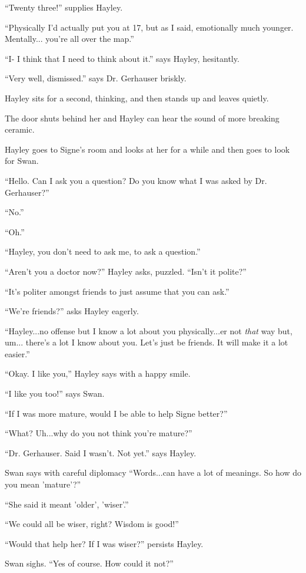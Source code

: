 ``Twenty three!'' supplies Hayley.

``Physically I'd actually put you at 17, but as I said, emotionally much younger.  Mentally... you're all over the map.''

``I- I think that I need to think about it.'' says Hayley, hesitantly.

``Very well, dismissed.'' says Dr. Gerhauser briskly.

Hayley sits for a second, thinking, and then stands up and leaves quietly.

The door shuts behind her and Hayley can hear the sound of more breaking ceramic.



Hayley goes to Signe's room and looks at her for a while and then goes to look for Swan.  

``Hello.  Can I ask you a question?  Do you know what I was asked by Dr. Gerhauser?''

``No.''

``Oh.''

``Hayley, you don't need to ask me, to ask a question.''

``Aren't you a doctor now?'' Hayley asks, puzzled.  ``Isn't it polite?''

``It's politer amongst friends to just assume that you can ask.''

``We're friends?'' asks Hayley eagerly.

``Hayley...no offense but I know a lot about you physically...er not \textit{that }way but, um... there's a lot I know about you. Let's just be friends.  It will make it a lot easier.''

``Okay.  I like you,'' Hayley says with a happy smile.

``I like you too!'' says Swan.

``If I was more mature, would I be able to help Signe better?''

``What?  Uh...why do you not think you're mature?''

``Dr. Gerhauser.  Said I wasn't.  Not yet.'' says Hayley.

Swan says with careful diplomacy  ``Words...can have a lot of meanings.  So how do you mean 'mature'?''

``She said it meant 'older', 'wiser'.''

``We could all be wiser, right?  Wisdom is good!''

``Would that help her?  If I was wiser?'' persists Hayley.

Swan sighs.  ``Yes of course.  How could it not?''

